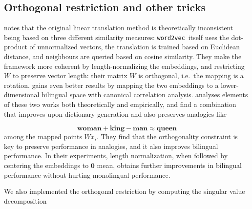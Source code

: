 \documentclass[11pt]{article}
\begin{document}

\subsection{Orthogonal restriction and other tricks} 

\newcommand{\wordtovec}{\texttt{word2vec}}

\cite{Xing:2015} notes that the original linear translation method is
theoretically inconsistent being based on three different similarity measures:
\wordtovec~itself uses the dot-product of unnormalized vectors, the translation
is trained based on Euclidean distance, and neighbours are queried based on
cosine similarity. They make the framework more coherent by length-normalizing
the embeddings, and restricting $W$ to preserve vector length: their matrix
$W$ is orthogonal, i.e.~the mapping is a rotation.  \citep{Faruqui:2014} gains
even better results by mapping the two embeddings to a lower-dimensional
bilingual space with canonical correlation analysis.  \citep{Artetxe:2016}
analyses elements of these two works both theoretically and empirically, and
find a combination that improves upon dictionary generation and also preserves
analogies like 

\[\mathbf{woman} + \mathbf{king}- \mathbf{man}  \approx \mathbf{queen}\] 
among the mapped points $Wx_i$. They find that the
orthogonality constraint is key to preserve performance in analogies, and it
also improves bilingual performance.  In their experiments, length
normalization, when followed by centering the embeddings to $\mathbf 0$ mean,
obtains further improvements in bilingual performance without hurting
monolingual performance.

We also implemented the orthogonal restriction by computing the singular value
decomposition 
\end{document}
